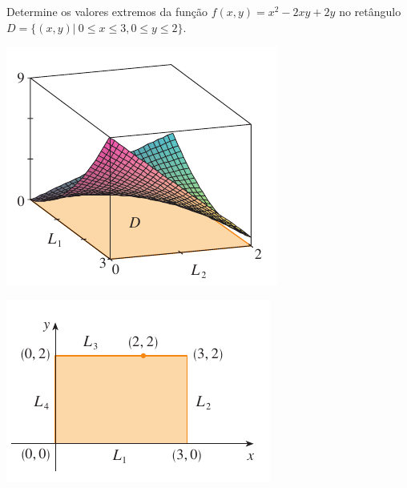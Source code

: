 \begin{frame}[label=otimizacao]
\begin{exe}
Determine os valores extremos da função $f(x,y)=x^2-2xy+2y$ no retângulo $D=\{(x,y) |\ 0\leq x\leq 3, 0\leq y\leq 2 \}$.
\end{exe}

\begin{minipage}{0.45\textwidth}
\includegraphics[scale=0.5]{figuras/sec-15_7-fig13.png}
\end{minipage}
\begin{minipage}{0.45\textwidth}
\includegraphics[scale=0.5]{figuras/max1.png}
\end{minipage}
\end{frame}



%
%
%
%




